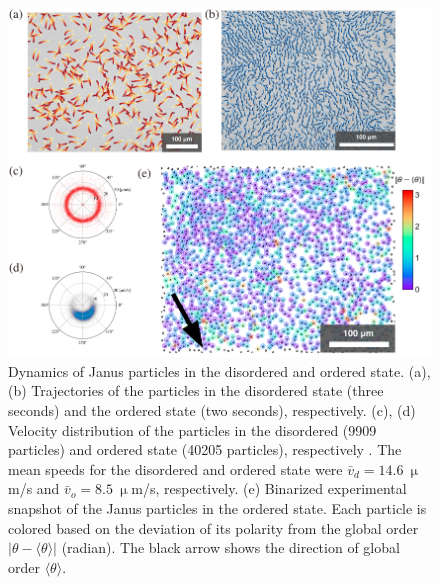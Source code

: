 \documentclass[%
 reprint,
 amsmath,amssymb,
 aps,
 floatfix
]{revtex4-2}
\begin{document}
\begin{figure}[t!]
\includegraphics[width=1.7\columnwidth]{trajectories_distributions2.pdf}
\caption{\label{ordered_janus} Dynamics of Janus particles in the disordered and ordered state. 
(a), (b) Trajectories of the particles in the disordered state (three seconds) and the ordered state (two seconds), respectively. 
(c), (d) Velocity distribution of the particles in the disordered (9909 particles) and ordered state (40205 particles), respectively \cite{supplement}.
The mean speeds for the disordered and ordered state were $\bar{v}_d=14.6\ \upmu$m/s and $\bar{v}_o = 8.5\ \upmu$m/s, respectively.
(e) Binarized experimental snapshot of the Janus particles in the ordered state.
Each particle is colored based on the deviation of its polarity from the global order $\left|{\theta}-\langle\theta\rangle\right|$ (radian).
The black arrow shows the direction of global order $\langle\theta\rangle$.}
\end{figure}
\end{document}
